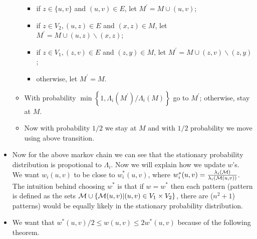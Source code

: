 \begin{itemize}
\begin{flushleft}
\begin{itemize}
\begin{itemize}
		
		\item if $z \in\{u, v\}$ and $(u, v) \in E$, let $M^{\prime}=M \cup(u, v)$;
		\item if $z \in V_2,(u, z) \in E$ and $(x, z) \in M$, let $M^{\prime}=M \cup(u, z) \backslash(x, z)$;
		\item if $z \in V_1,(z, v) \in E$ and $(z, y) \in M$, let $M^{\prime}=M \cup(z, v) \backslash(z, y)$;
		\item otherwise, let $M^{\prime}=M$.
	\end{itemize}
		\item With probability $\min \left\{1, \Lambda_i\left(M^{\prime}\right) / \Lambda_i(M)\right\}$ go to $M^{\prime}$; otherwise, stay at $M$.
		\item Now with probability $1/2$ we stay at $M$ and with $1/2$ probability we move using above transition.
	
	\end{itemize}
\end{flushleft}
\item \begin{flushleft}
	Now for the above markov chain we can see that the stationary probability distribution is propotional to $\Lambda_i$. Now we will explain how we update $w$'s.\\
	We want $w_i(u,v)$ to be close to $w_i^*(u,v)$, where $w^*_i(u,v) = \frac{\lambda_i(\mathcal{M})}{\lambda_i(\mathcal{M}(u,v))}$. The intuition behind choosing $w^*$ is that if $w=w^*$ then each pattern (pattern is defined as the sets $\mathcal{M}\cup \{\mathcal{M}(u,v)| (u,v)\in V_1 \times V_2\}$, there are ($n^2+1$) patterns) would be equally likely in the stationary probability distribution.
\end{flushleft}
\item We want that $w^*(u,v)/2 \leq w(u,v) \leq 2w^*(u,v)$ because of the following theorem.



\end{itemize}
